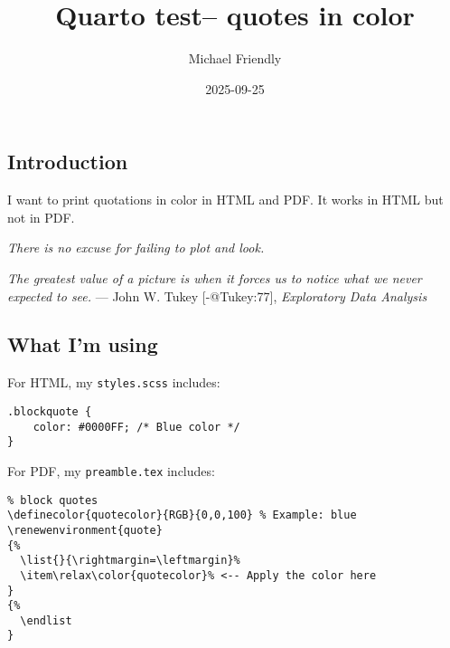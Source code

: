 \documentclass[
  10pt,
  krantz2,
  titlepage,
  letterpaper]{krantz}
\title{Quarto test-- quotes in color}
\author{Michael Friendly}
\date{2025-09-25}
\renewenvironment{quote}
{%
  \list{}{\rightmargin=\leftmargin}%
  \item\relax\color{quotecolor}%
}
{%
  \endlist
}
\begin{document}
\maketitle


\subsection{Introduction}\label{introduction}

I want to print quotations in color in HTML and PDF. It works in HTML
but not in PDF.

\begin{quote}
\emph{There is no excuse for failing to plot and look.}

\emph{The greatest value of a picture is when it forces us to notice
what we never expected to see.} --- John W. Tukey {[}-@Tukey:77{]},
\emph{Exploratory Data Analysis}
\end{quote}

\subsection{What I'm using}\label{what-im-using}

For HTML, my \texttt{styles.scss} includes:

\begin{verbatim}
.blockquote {
    color: #0000FF; /* Blue color */
}
\end{verbatim}

For PDF, my \texttt{preamble.tex} includes:

\begin{verbatim}
% block quotes
\definecolor{quotecolor}{RGB}{0,0,100} % Example: blue
\renewenvironment{quote}
{%
  \list{}{\rightmargin=\leftmargin}%
  \item\relax\color{quotecolor}% <-- Apply the color here
}
{%
  \endlist
}
\end{verbatim}
\end{document}
